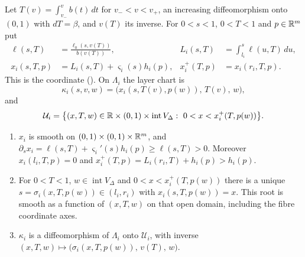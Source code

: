 \begin{construction}\label{cons:str-layer-coords}
Let $T(v)=\int_{v_-}^vb(t)\,dt$ for $v_-<v<v_+$, an increasing diffeomorphism onto $(0,1)$ with $dT=\beta$, and $v(T)$ its
inverse. For $0<s<1$, $0<T<1$ and $p\in\mathbb{R}^m$ put
\begin{align*}
 \ell(s,T)&=\frac{\ell_0(s,v(T))}{b(v(T))},&
 L_i(s,T)&=\int_{l_i}^s\ell(u,T)\,du,\\
 x_i(s,T,p)&=L_i(s,T)+\varsigma_i(s)h_i(p),&
 x_i^+(T,p)&=x_i(r_i,T,p).
\end{align*}
This is the coordinate (). On $\Lambda_i$ the layer chart is
\[
 \kappa_i(s,v,w)=\big(x_i(s,T(v),p(w)),\,T(v),\,w\big),
\]
and
\[
 \mathcal U_i=\big\{(x,T,w)\in\R\times(0,1)\times\operatorname{int}V_\Delta:\ 0<x<x_i^+(T,p(w))\big\}.
\]
\end{construction}

\begin{lemma}\label{lem:str-layer-root}
\begin{enumerate}[label=(\roman*)]
\item $x_i$ is smooth on $(0,1)\times(0,1)\times\mathbb{R}^m$, and
$\partial_sx_i=\ell(s,T)+\varsigma_i'(s)h_i(p)\ge\ell(s,T)>0$. Moreover $x_i(l_i,T,p)=0$ and
$x_i^+(T,p)=L_i(r_i,T)+h_i(p)>h_i(p)$.
\item For $0<T<1$, $w\in\operatorname{int}V_\Delta$ and $0<x<x_i^+(T,p(w))$ there is a unique
$s=\sigma_i(x,T,p(w))\in(l_i,r_i)$ with $x_i(s,T,p(w))=x$. This root is smooth as a function
of $(x,T,w)$ on that open domain, including the fibre coordinate axes.
\item $\kappa_i$ is a diffeomorphism of $\Lambda_i$ onto $\mathcal U_i$, with inverse
$(x,T,w)\mapsto\big(\sigma_i(x,T,p(w)),\,v(T),\,w\big)$.
\end{enumerate}
\end{lemma}

